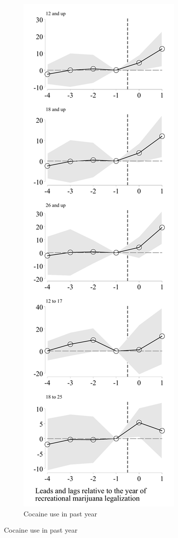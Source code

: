 \documentclass[12pt]{article}%
\begin{document}
\begin{figure}
\begin{minipage}{.9\linewidth}
\begin{subfigure}[b]{0.32\columnwidth}
    \label{fig:lead_lag_tob_30}
  \end{subfigure}
   \hfill %
  \begin{subfigure}[b]{0.32\columnwidth}
    \caption{Cocaine use in past year}
    \includegraphics[width=\linewidth]{../output/plots/event-study-estimates-ln-coke_use_365.pdf}

\end{subfigure}
\end{minipage}
\end{figure}
\end{document}
